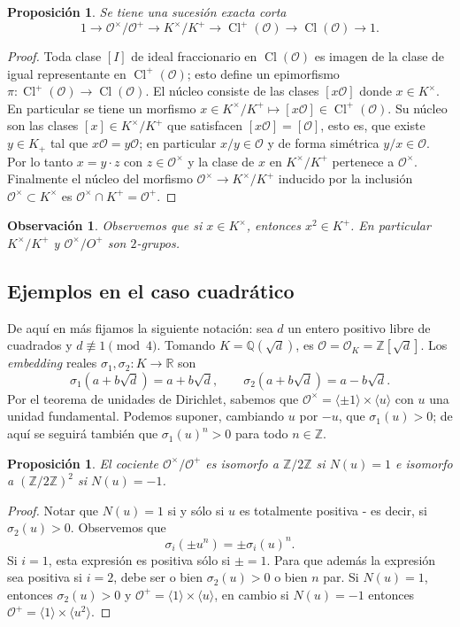 \documentclass[11pt,a4paper]{amsart}
\newcommand{\R}{\mathbb{R}}
\newcommand{\Q}{\mathbb{Q}}
\newcommand{\Z}{\mathbb{Z}}
\DeclareMathOperator{\CL}{Cl}
\numberwithin{equation}{section}
\theoremstyle{plain}
\newtheorem{prop}[equation]{Proposición}
\newtheorem{obs}[equation]{Observación}
\renewcommand{\O}{\mathcal{O}}
\begin{document}
\begin{prop} Se tiene una sucesión exacta corta
\[
1 \to \O^\times/\O^+ \to K^\times/K^+ \to
\CL^+(\O) \to \CL(\O) \to 1.
\]
\end{prop}
\begin{proof} Toda clase $[I]$ de ideal fraccionario
en $\CL(\O)$ es imagen de la clase de igual representante en $\CL^+(\O)$;
esto define un epimorfismo $\pi \colon \CL^+(\O)\to\CL(\O)$. El núcleo consiste
de las clases $[x \O]$ donde $x \in K^\times$. En particular se tiene
un morfismo $x\in K^\times/K^+ \mapsto [x \O] \in \CL^+(\O)$.
Su núcleo son las clases $[x] \in K^\times/K^+$ que satisfacen
$[x\O] = [\O]$, esto es, que existe $y \in K_+$ tal que $x \O = y \O$;
en particular $x/y \in \O$ y de forma simétrica $y/x \in \O$.
Por lo tanto $x = y \cdot z$ con $z \in \O^\times$
y la clase de $x$ en $K^\times/K^+$ pertenece a $\O^\times$. Finalmente
el núcleo del morfismo $\O^\times \to K^\times/K^+$ inducido por la inclusión
$\O^\times \subset K^\times$ es $\O^\times \cap K^+ = \O^+$.
\end{proof}

\begin{obs} Observemos que si $x \in K^\times$, entonces $x^2 \in K^+$.
En particular $K^\times/K^+$ y $\O^\times/O^+$ son $2$-grupos.
\end{obs}

\subsection{Ejemplos en el caso cuadrático} De aquí en más fijamos
la siguiente notación: sea $d$ un entero positivo
libre de cuadrados y
$d \not \equiv 1 \pmod{4}$. Tomando $K = \Q(\sqrt{d})$, es $\O = \O_K =
\Z[\sqrt{d}]$. Los \textit{embedding} reales $\sigma_1, \sigma_2 \colon K
\to \R$ son
\[
\sigma_1(a+b\sqrt{d}) = a+b\sqrt{d}, \qquad
\sigma_2(a+b\sqrt{d}) = a-b\sqrt{d}.
\]
Por el teorema de unidades de Dirichlet, sabemos que $\mathcal O^\times
= \langle\pm 1\rangle \times \langle u \rangle$ con $u$ una unidad
fundamental. Podemos suponer, cambiando $u$ por $-u$, que $\sigma_1(u) > 0$;
de aquí se seguirá también que $\sigma_1(u)^n > 0$ para todo $n \in \Z$.


\begin{prop} El cociente $\O^\times/\O^+$ es isomorfo a $\Z/2\Z$
si $N(u) = 1$ e isomorfo a $(\Z/2\Z)^2$ si $N(u) = -1$.
\end{prop}
\begin{proof}
Notar que $N(u) = 1$ si y sólo si $u$ es totalmente positiva
- es decir, si $\sigma_2(u)>0$. Observemos que
\[
\sigma_i(\pm u^n) = \pm \sigma_i(u)^n.
\]
Si $i = 1$, esta expresión es positiva sólo si $\pm = 1$. Para que además
la expresión sea positiva si $i = 2$, debe ser o bien $\sigma_2(u) > 0$
o bien $n$ par. Si $N(u) = 1$, entonces $\sigma_2(u) > 0$ y $\O^+
= \langle 1 \rangle \times \langle u \rangle$, en cambio si $N(u) = -1$
entonces $\O^+ = \langle 1 \rangle \times \langle u^2 \rangle$.
\end{proof}
\end{document}
